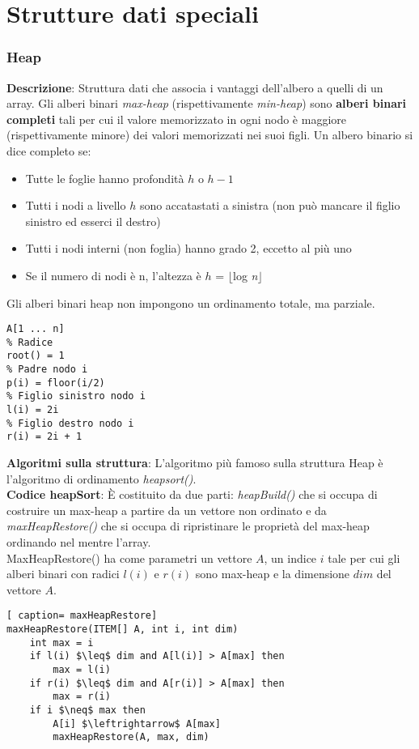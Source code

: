 \documentclass[../cheatSheetAlgoritmi.tex]{subfiles}
\begin{document}
\chapter{Strutture dati speciali}
\subsection{Heap}
\label{sec:heap}
\textbf{Descrizione}: Struttura dati che associa i vantaggi dell'albero a quelli di un array. Gli alberi binari \emph{max-heap} (rispettivamente \emph{min-heap}) sono \textbf{alberi binari completi} tali per cui il valore memorizzato in ogni nodo è maggiore (rispettivamente minore) dei valori memorizzati nei suoi figli. Un albero binario si dice completo se:
\begin{itemize}
 	\item Tutte le foglie hanno profondità $h$ o $h-1$ 
 	\item Tutti i nodi a livello $h$ sono accatastati a sinistra (non può mancare il figlio sinistro ed esserci il destro)
 	\item Tutti i nodi interni (non foglia) hanno grado 2, eccetto al più uno
 	\item Se il numero di nodi è n, l'altezza è $h$ = $\lfloor$log \textit{n}$\rfloor$
\end{itemize}
Gli alberi binari heap non impongono un ordinamento totale, ma parziale.
\begin{lstlisting}[caption= Memorizzazione Heap con Vettore]
% Vettore di memorizzazione
A[1 ... n]
% Radice
root() = 1
% Padre nodo i
p(i) = floor(i/2)
% Figlio sinistro nodo i
l(i) = 2i
% Figlio destro nodo i
r(i) = 2i + 1
\end{lstlisting}
\textbf{Algoritmi sulla struttura}: L'algoritmo più famoso sulla struttura Heap è l'algoritmo di ordinamento \emph{heapsort()}. \\
\textbf{Codice heapSort}: È costituito da due parti: \emph{heapBuild()} che si occupa di costruire un max-heap a partire da un vettore non ordinato e da \emph{maxHeapRestore()} che si occupa di ripristinare le proprietà del max-heap ordinando nel mentre l'array.  \\
MaxHeapRestore() ha come parametri un vettore $A$, un indice $i$ tale per cui gli alberi binari con radici $l(i)$ e $r(i)$ sono max-heap e la dimensione $dim$ del vettore $A$. 
\begin{lstlisting}[ caption= maxHeapRestore]
maxHeapRestore(ITEM[] A, int i, int dim)
	int max = i
	if l(i) $\leq$ dim and A[l(i)] > A[max] then
		max = l(i)
	if r(i) $\leq$ dim and A[r(i)] > A[max] then
		max = r(i)
	if i $\neq$ max then
		A[i] $\leftrightarrow$ A[max]
		maxHeapRestore(A, max, dim)
\end{lstlisting}
\end{document}
